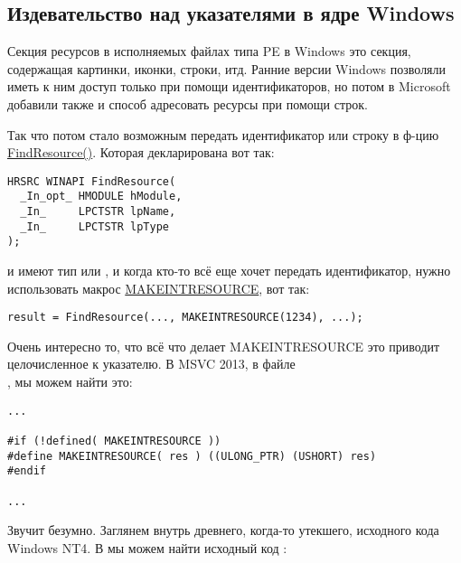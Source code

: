 \subsection{Издевательство над указателями в ядре Windows}

Секция ресурсов в исполняемых файлах типа PE в Windows это секция, содержащая картинки, иконки, строки, итд.
Ранние версии Windows позволяли иметь к ним доступ только при помощи идентификаторов, но потом в Microsoft добавили
также и способ адресовать ресурсы при помощи строк.

Так что потом стало возможным передать идентификатор или строку в ф-цию
\href{https://msdn.microsoft.com/en-us/library/windows/desktop/ms648042%28v=vs.85%29.aspx}{FindResource()}.
Которая декларирована вот так:


\begin{lstlisting}[style=customc]
HRSRC WINAPI FindResource(
  _In_opt_ HMODULE hModule,
  _In_     LPCTSTR lpName,
  _In_     LPCTSTR lpType
);
\end{lstlisting}

 и  имеют тип  или , и когда кто-то всё еще хочет передать идентификатор,
нужно использовать макрос
\href{https://msdn.microsoft.com/en-us/library/windows/desktop/ms648029%28v=vs.85%29.aspx}{MAKEINTRESOURCE}, вот так:


\begin{lstlisting}[style=customc]
result = FindResource(..., MAKEINTRESOURCE(1234), ...);
\end{lstlisting}

Очень интересно то, что всё что делает MAKEINTRESOURCE это приводит целочисленное к указателю.
В MSVC 2013, в файле\\
,
мы можем найти это:

\begin{lstlisting}[style=customc]
...

#if (!defined( MAKEINTRESOURCE )) 
#define MAKEINTRESOURCE( res ) ((ULONG_PTR) (USHORT) res)
#endif

...
\end{lstlisting}

Звучит безумно. Заглянем внутрь древнего, когда-то утекшего, исходного кода Windows NT4.
В  мы можем найти исходный код :

